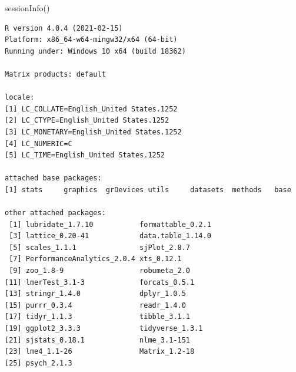 \documentclass[
  english,
]{book}
\newenvironment{Shaded}{\begin{snugshade}}{\end{snugshade}}
\newcommand{\FunctionTok}[1]{\textcolor[rgb]{0.00,0.00,0.00}{#1}}
\newcommand{\NormalTok}[1]{#1}
\begin{document}
\begin{Shaded}
\begin{Highlighting}[]
\FunctionTok{sessionInfo}\NormalTok{()}
\end{Highlighting}
\end{Shaded}

\begin{verbatim}
R version 4.0.4 (2021-02-15)
Platform: x86_64-w64-mingw32/x64 (64-bit)
Running under: Windows 10 x64 (build 18362)

Matrix products: default

locale:
[1] LC_COLLATE=English_United States.1252 
[2] LC_CTYPE=English_United States.1252   
[3] LC_MONETARY=English_United States.1252
[4] LC_NUMERIC=C                          
[5] LC_TIME=English_United States.1252    

attached base packages:
[1] stats     graphics  grDevices utils     datasets  methods   base     

other attached packages:
 [1] lubridate_1.7.10           formattable_0.2.1         
 [3] lattice_0.20-41            data.table_1.14.0         
 [5] scales_1.1.1               sjPlot_2.8.7              
 [7] PerformanceAnalytics_2.0.4 xts_0.12.1                
 [9] zoo_1.8-9                  robumeta_2.0              
[11] lmerTest_3.1-3             forcats_0.5.1             
[13] stringr_1.4.0              dplyr_1.0.5               
[15] purrr_0.3.4                readr_1.4.0               
[17] tidyr_1.1.3                tibble_3.1.1              
[19] ggplot2_3.3.3              tidyverse_1.3.1           
[21] sjstats_0.18.1             nlme_3.1-151              
[23] lme4_1.1-26                Matrix_1.2-18             
[25] psych_2.1.3               


\end{verbatim}
\end{document}
